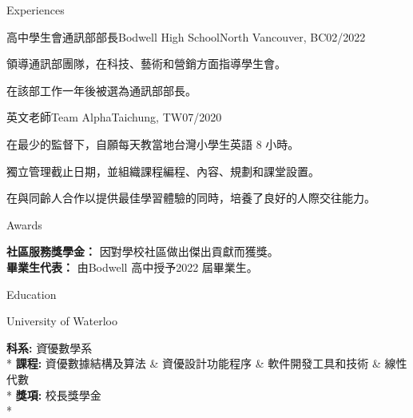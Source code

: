 \documentclass{article}
\newlength{\tabin}
\newlength{\secsep}
\newcommand{\lineunder}{\vspace*{-8pt} \\ \hspace*{-6pt} \hrulefill \\ \vspace*{-15pt}}
\newenvironment{tabbedsection}[1]{
  \begin{list}{}{
      \setlength{\itemsep}{0pt}
      \setlength{\labelsep}{0pt}
      \setlength{\labelwidth}{0pt}
      \setlength{\leftmargin}{\tabin}
      \setlength{\rightmargin}{\tabin}
      \setlength{\listparindent}{0pt}
      \setlength{\parsep}{0pt}
      \setlength{\parskip}{0pt}
      \setlength{\partopsep}{0pt}
      \setlength{\topsep}{#1}
    }
  \item[]
}{\end{list}}
\newenvironment{nospacetabbing}{
    \begin{tabbing}
}{\end{tabbing}\vspace{-1.2em}}
\newenvironment{resume_section}[1]{
  \filbreak
  \vspace{2\secsep}
  \textsc{\large#1}
  \lineunder
  \begin{tabbedsection}{\secsep}
}{\end{tabbedsection}}
\newenvironment{resume_subsection}[2][]{
  \textbf{#2} \hfill {\footnotesize #1} \hspace{-5.1em}
  \begin{tabbedsection}{0.5\secsep}
}{\end{tabbedsection}}
\newenvironment{subitems}{
  \renewcommand{\labelitemi}{-}
  \begin{itemize}
      \setlength{\labelsep}{1em}
}{\end{itemize}}
\newenvironment{resume_employer}[4]{
  \vspace{\secsep}
  \textbf{#1} {\footnotesize #3} \hfill {\footnotesize#4} \hspace{-1em} \\
  \small{#2}  
  \vspace{\secsep}
  \begin{tabbedsection}{0pt}
  \begin{subitems}
}{\end{subitems}\end{tabbedsection}}
\begin{document}
\begin{CJK*}{UTF8}{bsmi}
\begin{resume_section}{Experiences}
  \begin{resume_employer}{高中學生會通訊部部長}{Bodwell High School}{North Vancouver, BC}{02/2022}
    \item 領導通訊部團隊，在科技、藝術和營銷方面指導學生會。
    \item 在該部工作一年後被選為通訊部部長。
  \end{resume_employer}

  \begin{resume_employer}{英文老師}{Team Alpha}{Taichung, TW}{07/2020}
    \item 在最少的監督下，自願每天教當地台灣小學生英語 8 小時。
    \item 獨立管理截止日期，並組織課程編程、內容、規劃和課堂設置。
    \item 在與同齡人合作以提供最佳學習體驗的同時，培養了良好的人際交往能力。
  \end{resume_employer}

\end{resume_section}
  
\begin{resume_section}{Awards}
  \begin{nospacetabbing}
    \textbf{社區服務獎學金：} \= 因對學校社區做出傑出貢獻而獲獎。\\
    \textbf{畢業生代表：} \> 由Bodwell 高中授予2022 屆畢業生。\\
  \end{nospacetabbing}
\end{resume_section}

\begin{resume_section}{Education}
  \begin{resume_subsection}[07/2022 - Present]{University of Waterloo}
    \begin{nospacetabbing}
      \textbf{科系:} \= 資優數學系\\*
      \textbf{課程:} \> 資優數據結構及算法  \& 資優設計功能程序  \& 軟件開發工具和技術  \& 線性代數 \\*
      \textbf{獎項:} \> 校長獎學金\\*
    \end{nospacetabbing}
  \end{resume_subsection}
\end{resume_section}

\end{CJK*}  
\end{document}
